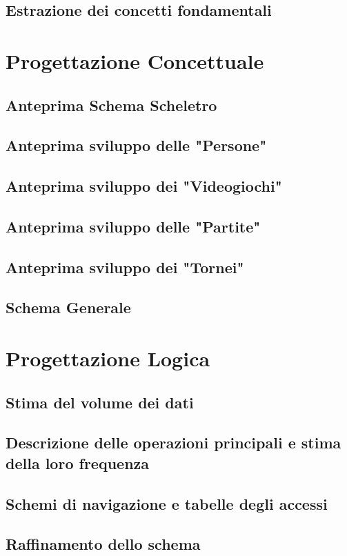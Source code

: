 \documentclass[a4paper,12pt]{report}
\begin{document}
\section{Estrazione dei concetti fondamentali}


\chapter{Progettazione Concettuale}

\section{Anteprima Schema Scheletro}
\section{Anteprima sviluppo delle "Persone"}
\section{Anteprima sviluppo dei "Videogiochi"}
\section{Anteprima sviluppo delle "Partite"}
\section{Anteprima sviluppo dei "Tornei"}
\section{Schema Generale}


\chapter{Progettazione Logica}
\section{Stima del volume dei dati}
\section{Descrizione delle operazioni principali e stima della loro frequenza}
\section{Schemi di navigazione e tabelle degli accessi}
\section{Raffinamento dello schema}
\end{document}

